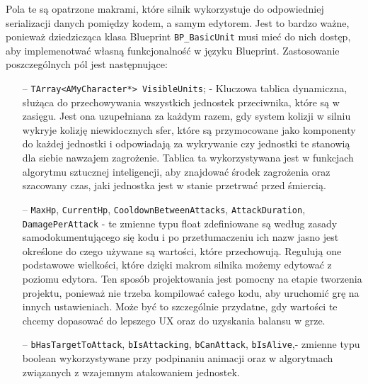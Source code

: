 \documentclass[12pt]{report}
\begin{document}
Pola te są opatrzone makrami, które silnik wykorzystuje do odpowiedniej serializacji danych pomiędzy kodem, a samym edytorem. Jest to bardzo ważne, ponieważ dziedzicząca klasa Blueprint \texttt{BP\_BasicUnit} musi mieć do nich dostęp, aby implemenotwać własną funkcjonalność w języku Blueprint. Zastosowanie poszczególnych pól jest następnujące:
\begin{itemize}
\item[--] \texttt{TArray<AMyCharacter*> VisibleUnits}; - Kluczowa tablica dynamiczna, służąca do przechowywania wszystkich jednostek przeciwnika, które są w zasięgu. Jest ona uzupełniana za każdym razem, gdy system kolizji w silniu wykryje kolizję niewidocznych sfer, które są przymocowane jako komponenty do każdej jednostki i odpowiadają za wykrywanie czy jednostki te stanowią dla siebie nawzajem zagrożenie. Tablica ta wykorzystywana jest w funkcjach algorytmu sztucznej inteligencji, aby znajdować środek zagrożenia oraz szacowany czas, jaki jednostka jest w stanie przetrwać przed śmiercią.
\item[--] \texttt{MaxHp}, \texttt{CurrentHp}, \texttt{CooldownBetweenAttacks}, \texttt{AttackDuration}, \texttt{DamagePerAttack} - te zmienne typu float zdefiniowane są według zasady samodokumentującego się kodu i po przetłumaczeniu ich nazw jasno jest określone do czego używane są wartości, które przechowują. Regulują one podstawowe wielkości, które dzięki makrom silnika możemy edytować z poziomu edytora. Ten sposób projektowania jest pomocny na etapie tworzenia projektu, ponieważ nie trzeba kompilować całego kodu, aby uruchomić grę na innych ustawieniach. Może być to szczególnie przydatne, gdy wartości te chcemy dopasować do lepszego UX oraz do uzyskania balansu w grze.
\item[--] \texttt{bHasTargetToAttack}, \texttt{bIsAttacking}, \texttt{bCanAttack}, \texttt{bIsAlive},- zmienne typu boolean wykorzystywane przy podpinaniu animacji oraz w algorytmach związanych z wzajemnym atakowaniem jednostek.

\end{itemize}
\end{document}
